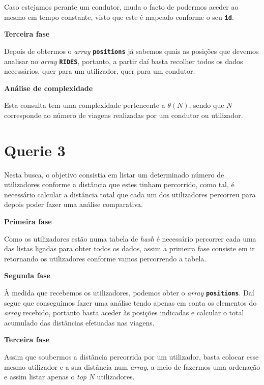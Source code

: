 \documentclass[12pt,a4paper]{report}
\begin{document}
Caso estejamos perante um condutor, muda o facto de podermos aceder ao mesmo em tempo constante, visto que este é mapeado conforme o seu \textbf{\small\texttt{id}}.

\normalsize\textbf{Terceira fase }{\titlerule[0.5pt]}

Depois de obtermos o \textit{array} \textbf{\small\texttt{positions}} já sabemos quais as posições que devemos analisar no \textit{array} \textbf{\small\texttt{RIDES}}, portanto, a partir daí basta recolher todos os dados necessários, quer para um utilizador, quer para um condutor.

\normalsize\textbf{Análise de complexidade }{\titlerule[0.5pt]}

Esta consulta tem uma complexidade pertencente a \(\theta(N)\), sendo que \(N\) corresponde ao número de viagens realizadas por um condutor ou utilizador.

\vspace{-6pt}
\section{Querie 3}

Nesta busca, o objetivo consistia em listar um determinado número de utilizadores conforme a distância que estes tinham percorrido, como tal, é necessário calcular a distância total que cada um dos utilizadores percorreu para depois poder fazer uma análise comparativa.

\normalsize\textbf{Primeira fase }{\titlerule[0.5pt]}

Como os utilizadores estão numa tabela de \textit{hash} é necessário percorrer cada uma das listas ligadas para obter todos os dados, assim a primeira fase consiste em ir retornando os utilizadores conforme vamos percorrendo a tabela.

\normalsize\textbf{Segunda fase }{\titlerule[0.5pt]}

À medida que recebemos os utilizadores, podemos obter o \textit{array} \textbf{\small\texttt{positions}}. Daí segue que conseguimos fazer uma análise tendo apenas em conta os elementos do \textit{array} recebido, portanto basta aceder às posições indicadas e calcular o total acumulado das distâncias efetuadas nas viagens.

\normalsize\textbf{Terceira fase }{\titlerule[0.5pt]}

Assim que soubermos a distância percorrida por um utilizador, basta colocar esse mesmo utilizador e a sua distância num \textit{array}, a meio de fazermos uma ordenação e assim listar apenas o \textit{top} \(N\) utilizadores.
\end{document}
